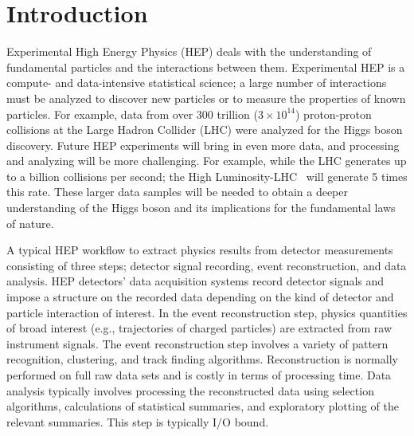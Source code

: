\section{Introduction}
\label{sec:intro}
\squeezeup
Experimental High Energy Physics (HEP) deals with the understanding of fundamental particles and the interactions between them.
Experimental HEP is a compute- and data-intensive statistical science; a large number of interactions 
must be analyzed to discover new particles or to measure the properties of known particles. 
For example, data from over $300$ trillion ($3\times10^{14}$) proton-proton collisions at the Large Hadron Collider (LHC) were analyzed for the Higgs boson discovery.
Future HEP experiments will bring in even more data, and processing and 
analyzing will be more challenging. For example, while the LHC generates up to a billion collisions per second; the High Luminosity-LHC~\cite{hllhc} will generate 5 times this rate. These larger data samples will be needed to obtain a 
deeper understanding of the Higgs boson and its implications for the fundamental laws of nature. 
 
A typical HEP workflow to extract physics results from detector measurements consisting 
of three steps; 
detector signal recording, event reconstruction, and data analysis. 
HEP detectors' data acquisition systems record detector signals and impose 
 a structure on the recorded data depending on the kind of detector and particle 
 interaction of interest. In the event reconstruction step, physics quantities of broad interest 
(e.g., trajectories of charged particles) are extracted from raw instrument signals. 
The event reconstruction step involves a variety of pattern recognition, clustering, and track finding algorithms. 
Reconstruction is normally performed on full raw data sets and is costly in terms of processing time.
Data analysis typically involves processing the reconstructed data using 
selection algorithms, calculations of statistical summaries, and exploratory plotting of the relevant summaries. 
This step is typically I/O bound. 

